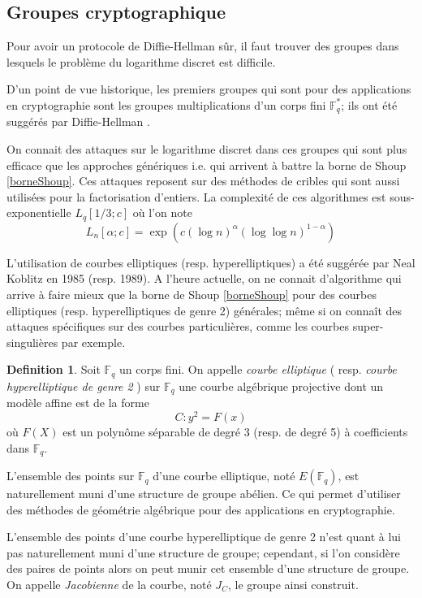 \documentclass[a4paper]{article}
\theoremstyle{definition}
\newtheorem{definition}{Definition}[section]
\theoremstyle{remark}
\numberwithin{equation}{section}
\begin{document}
\subsection{Groupes cryptographique}
Pour avoir un protocole de Diffie-Hellman sûr, il faut trouver des groupes dans lesquels le problème du logarithme discret est difficile.

D'un point de vue historique, les premiers groupes qui sont pour des applications en cryptographie sont les groupes multiplications d'un corps fini $\mathbb{F}^*_q$; ils ont été suggérés par Diffie-Hellman \cite{diffie-hellman}.

On connait des attaques sur le logarithme discret dans ces groupes qui sont plus efficace que les approches génériques i.e. qui arrivent à battre la borne de Shoup \ref{borneShoup}. Ces attaques reposent sur des méthodes de cribles qui sont aussi utilisées pour la factorisation d'entiers. La complexité de ces algorithmes est sous-exponentielle $L_q[1/3;c]$ où l'on note
$$L_n[\alpha;c] = \exp(c(\log n)^\alpha(\log \log n)^{1-\alpha})$$

L'utilisation de courbes elliptiques (resp. hyperelliptiques) a été suggérée par Neal Koblitz \cite{koblitz1} \cite{koblitz2} en 1985 (resp. 1989). A l'heure actuelle, on ne connait d'algorithme qui arrive à faire mieux que la borne de Shoup \ref{borneShoup} pour des courbes elliptiques (resp. hyperelliptiques de genre 2) générales; même si on connaît des attaques spécifiques sur des courbes particulières, comme les courbes super-singulières par exemple.

\begin{definition}
Soit $\mathbb{F}_q$ un corps fini.
On appelle \emph{courbe elliptique} ( resp. \emph{courbe hyperelliptique de genre 2} ) sur $\mathbb{F}_q$ une courbe algébrique projective dont un modèle affine est de la forme
$$C : y^2 = F(x)$$
où $F(X)$ est un polynôme séparable de degré 3 (resp. de degré 5) à coefficients dans $\mathbb{F}_q$.
\end{definition}

L'ensemble des points sur $\mathbb{F}_q$ d'une courbe elliptique, noté $E(\mathbb{F}_q)$, est naturellement muni d'une structure de groupe abélien. Ce qui permet d'utiliser des méthodes de géométrie algébrique pour des applications en cryptographie.

L'ensemble des points d'une courbe hyperelliptique de genre 2 n'est quant à lui pas naturellement muni d'une structure de groupe; cependant, si l'on considère des paires de points alors on peut munir cet ensemble d'une structure de groupe. On appelle \emph{Jacobienne} de la courbe, noté $J_C$, le groupe ainsi construit.
\end{document}
